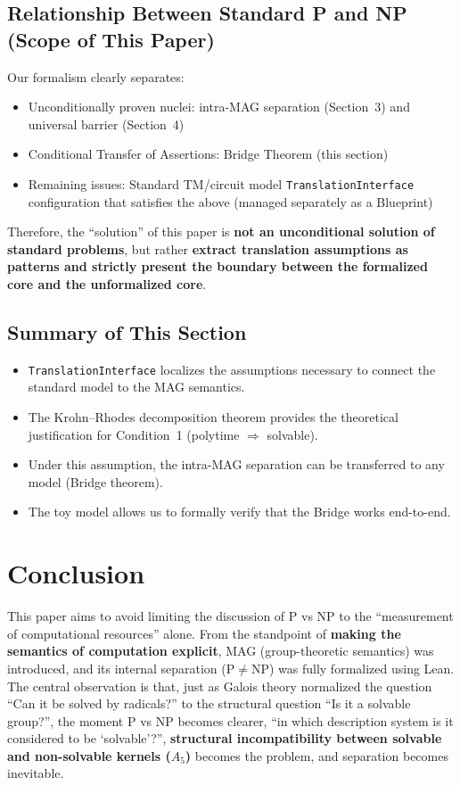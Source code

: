 \documentclass[11pt,a4paper]{article}
\theoremstyle{plain}
\theoremstyle{definition}
\newcommand{\Aalt}{A_5}
\newcommand{\TranslationInterface}{\texttt{TranslationInterface}}
\begin{document}
\subsection{Relationship Between Standard P and NP (Scope of This Paper)}

Our formalism clearly separates:
\begin{itemize}[nosep]
\item Unconditionally proven nuclei: intra-MAG separation (Section~3) and universal barrier (Section~4)
\item Conditional Transfer of Assertions: Bridge Theorem (this section)
\item Remaining issues: Standard TM/circuit model \TranslationInterface{} configuration that satisfies the above (managed separately as a Blueprint)
\end{itemize}
Therefore, the ``solution'' of this paper is \textbf{not an unconditional solution of standard problems}, but rather \textbf{extract translation assumptions as patterns and strictly present the boundary between the formalized core and the unformalized core}.

\subsection{Summary of This Section}

\begin{itemize}[nosep]
\item \TranslationInterface{} localizes the assumptions necessary to connect the standard model to the MAG semantics.
\item The Krohn--Rhodes decomposition theorem provides the theoretical justification for Condition~1 (polytime $\Rightarrow$ solvable).
\item Under this assumption, the intra-MAG separation can be transferred to any model (Bridge theorem).
\item The toy model allows us to formally verify that the Bridge works end-to-end.
\end{itemize}

\section{Conclusion}

This paper aims to avoid limiting the discussion of P vs NP to the ``measurement of computational resources'' alone. From the standpoint of \textbf{making the semantics of computation explicit}, MAG (group-theoretic semantics) was introduced, and its internal separation ($\mathrm{P} \neq \mathrm{NP}$) was fully formalized using Lean. The central observation is that, just as Galois theory normalized the question ``Can it be solved by radicals?'' to the structural question ``Is it a solvable group?'', the moment P vs NP becomes clearer, ``in which description system is it considered to be `solvable'?'', \textbf{structural incompatibility between solvable and non-solvable kernels ($\Aalt$)} becomes the problem, and separation becomes inevitable.
\end{document}
